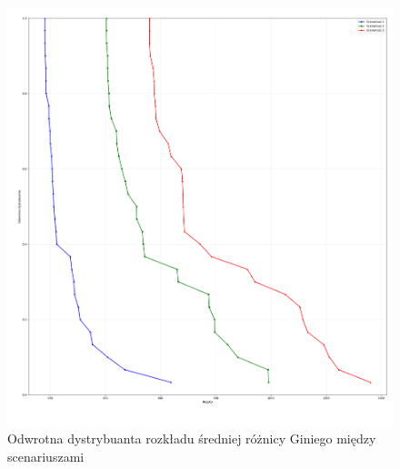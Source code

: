\documentclass[11pt,a4paper]{article}
\begin{document}
\begin{figure}[ht!]
\centering
\includegraphics[width=\textwidth]{graphics/ryzyko_dystrybuanta.png}
\caption{Odwrotna dystrybuanta rozkładu średniej różnicy Giniego między scenariuszami}
\label{fig:FSD-risk}
\end{figure}
\end{document}
